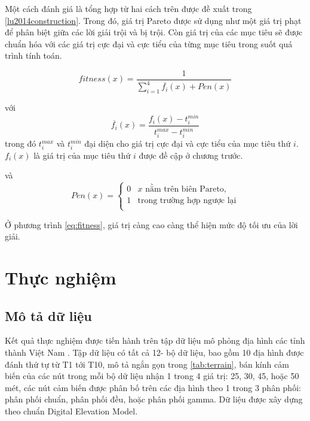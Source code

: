 \documentclass{hust}
\begin{document}
Một cách đánh giá là tổng hợp từ hai cách trên được đề xuất trong \ref{lu2014construction}. Trong đó, giá trị Pareto được sử dụng như một giá trị phạt để phân biệt giữa các lời giải trội và bị trội. Còn giá trị của các mục tiêu sẽ được chuẩn hóa với các giá trị cực đại và cực tiểu của từng mục tiêu trong suốt quá trình tính toán.

\begin{equation}\label{eq:fitness}
fitness (x) = \frac{1}{\sum_{i=1}^4 \overline{f_i}(x) + Pen(x)}
\end{equation}

với
\begin{equation}\label{eq:newObjective}
\overline{f_i}(x) = \frac{f_i(x) - t^{min}_i}{t^{max}_i - t^{min}_i}
\end{equation}
trong đó $t^{max}_i$ và $t^{min}_i$ đại diện cho giá trị cực đại và cực tiểu của mục tiêu thứ $i$. $f_i(x)$ là giá trị của mục tiêu thứ $i$ được đề cập ở chương trước.

và
\begin{equation}
Pen(x) = \begin{cases}
0 & \text{$x$ nằm trên biên Pareto,}\\
1 & \text{trong trường hợp ngược lại}\\
\end{cases}
\end{equation}

Ở phương trình \ref{eq:fitness}, giá trị càng cao càng thể hiện mức độ tối ưu của lời giải.


\chapter{Thực nghiệm}
\section{Mô tả dữ liệu}
Kết quả thực nghiệm được tiến hành trên tập dữ liệu mô phỏng địa hình các tỉnh thành Việt Nam \cite{tam2018improving}. Tập dữ liệu có tất cả 12- bộ dữ liệu, bao gồm 10 địa hình được đánh thứ tự từ T1 tới T10, mô tả ngắn gọn trong \ref{tab:terrain}, bán kính cảm biến của các nút trong mỗi bộ dữ liệu nhận 1 trong 4 giá trị: 25, 30, 45, hoặc 50 mét, các nút cảm biến được phân bố trên các địa hình theo 1 trong 3 phân phối: phân phối chuẩn, phân phối đều, hoặc phân phối gamma. Dữ liệu được xây dựng theo chuẩn Digital Elevation Model.
\end{document}
